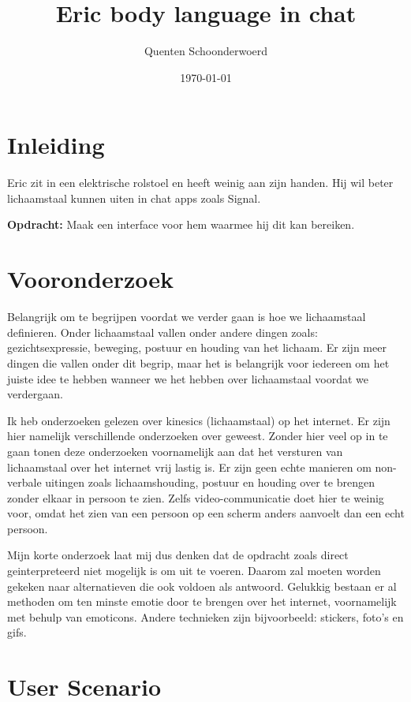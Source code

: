 \documentclass[12pt]{article}
\title{Eric body language in chat}
\author{Quenten Schoonderwoerd}
\date{\today}
\begin{document}
\maketitle

\section{Inleiding}

Eric zit in een elektrische rolstoel en heeft weinig aan zijn handen.
Hij wil beter lichaamstaal kunnen uiten in chat apps zoals Signal.

\textbf{Opdracht:}
Maak een interface voor hem waarmee hij dit kan bereiken.

\section{Vooronderzoek}

Belangrijk om te begrijpen voordat we verder gaan is hoe we lichaamstaal definieren.
Onder lichaamstaal vallen onder andere dingen zoals: gezichtsexpressie, beweging, postuur en houding van het lichaam.
Er zijn meer dingen die vallen onder dit begrip, maar het is belangrijk voor iedereen om het juiste idee te hebben wanneer we het hebben over lichaamstaal voordat we verdergaan.

Ik heb onderzoeken gelezen over kinesics (lichaamstaal) op het internet.
Er zijn hier namelijk verschillende onderzoeken over geweest.
Zonder hier veel op in te gaan tonen deze onderzoeken voornamelijk aan dat het versturen van lichaamstaal over het internet vrij lastig is.
Er zijn geen echte manieren om non-verbale uitingen zoals lichaamshouding, postuur en houding over te brengen zonder elkaar in persoon te zien.
Zelfs video-communicatie doet hier te weinig voor, omdat het zien van een persoon op een scherm anders aanvoelt dan een echt persoon.

Mijn korte onderzoek laat mij dus denken dat de opdracht zoals direct geinterpreteerd niet mogelijk is om uit te voeren.
Daarom zal moeten worden gekeken naar alternatieven die ook voldoen als antwoord.
Gelukkig bestaan er al methoden om ten minste emotie door te brengen over het internet, voornamelijk met behulp van emoticons.
Andere technieken zijn bijvoorbeeld: stickers, foto's en gifs.

\section{User Scenario}
\end{document}
